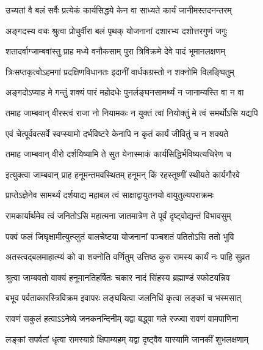 \twolineshloka
{उच्यतां वै बलं सर्वैः प्रत्येकं कार्यसिद्धये}
{केन वा साध्यते कार्यं जानीमस्तदनन्तरम्} %

\twolineshloka
{अङ्गदस्य वचः श्रुत्वा प्रोचुर्वीरा बलं पृथक्}
{योजनानां दशारभ्य दशोत्तरगुणं जगुः} %

\twolineshloka
{शतादर्वाग्जाम्बवांस्तु प्राह मध्ये वनौकसाम्}
{पुरा त्रिविक्रमे देवे पादं भूमानलक्षणम्} %

\twolineshloka
{त्रिःसप्तकृत्वोऽहमगां प्रदक्षिणविधानतः}
{इदानीं वार्धकग्रस्तो न शक्नोमि विलङ्घितुम्} %

\twolineshloka
{अङ्गदोऽप्याह मे गन्तुं शक्यं पारं महोदधेः}
{पुनर्लङ्घनसामर्थ्यं न जानाम्यस्ति वा न वा} %

\twolineshloka
{तमाह जाम्बवान् वीरस्त्वं राजा नो नियामकः}
{न युक्तं त्वां नियोक्तुं मे त्वं समर्थोऽसि यद्यपि} %


\twolineshloka
{एवं चेत्पूर्ववत्सर्वे स्वप्स्यामो दर्भविष्टरे}
{केनापि न कृतं कार्यं जीवितुं च न शक्यते} %

\twolineshloka
{तमाह जाम्बवान् वीरो दर्शयिष्यामि ते सुत}
{येनास्माकं कार्यसिद्धिर्भविष्यत्यचिरेण च} %

\twolineshloka
{इत्युक्त्वा जाम्बवान् प्राह हनूमन्तमवस्थितम्}
{हनूमन् किं रहस्तूष्णीं स्थीयते कार्यगौरवे} %

\twolineshloka
{प्राप्तेऽज्ञेनेव सामर्थ्यं दर्शयाद्य महाबल}
{त्वं साक्षाद्वायुतनयो वायुतुल्यपराक्रमः} %

\twolineshloka
{रामकार्यार्थमेव त्वं जनितोऽसि महात्मना}
{जातमात्रेण ते पूर्वं दृष्ट्वोद्यन्तं विभावसुम्} %

\twolineshloka
{पक्वं फलं जिघृक्षामीत्युत्प्लुतं बालचेष्टया}
{योजनानां पञ्चशतं पतितोऽसि ततो भुवि} %

\twolineshloka
{अतस्त्वद्बलमाहात्म्यं को वा शक्नोति वर्णितुम्}
{उत्तिष्ठ कुरु रामस्य कार्यं नः पाहि सुव्रत} %

\twolineshloka
{श्रुत्वा जाम्बवतो वाक्यं हनूमानतिहर्षितः}
{चकार नादं सिंहस्य ब्रह्माण्डं स्फोटयन्निव} %

\twolineshloka
{बभूव पर्वताकारस्त्रिविक्रम इवापरः}
{लङ्घयित्वा जलनिधिं कृत्वा लङ्कां च भस्मसात्} %

\twolineshloka
{रावणं सकुलं हत्वाऽऽनेष्ये जनकनन्दिनीम्}
{यद्वा बद्ध्वा गले रज्ज्वा रावणं वामपाणिना} %

\twolineshloka
{लङ्कां सपर्वतां धृत्वा रामस्याग्रे क्षिपाम्यहम्}
{यद्वा दृष्ट्वैव यास्यामि जानकीं शुभलक्षणाम्} %

